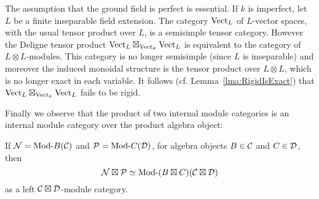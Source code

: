 \documentclass{amsart}
\begin{document}
\begin{example}
	The assumption that the ground field is perfect is essential. If $k$ is imperfect, let $L$ be a finite inseparable field extension. The category $\mathrm{Vect}_L$ of $L$-vector spaces, with the usual tensor product over $L$, is a semisimple tensor category. However the Deligne tensor product $\mathrm{Vect}_L \boxtimes_{\mathrm{Vect}_k} \mathrm{Vect}_L$
	is equivalent to the category of $L \otimes L$-modules. This category is no longer semisimple (since $L$ is inseparable) and moreover the induced monoidal structure is the tensor product over $L \otimes L$, which is no longer exact in each variable. It follows (cf. Lemma~\ref{lma:RigidIsExact}) that $\mathrm{Vect}_L \boxtimes_{\mathrm{Vect}_k} \mathrm{Vect}_L$ fails to be rigid. 
\end{example} 

Finally we observe that the product of two internal module categories is an internal module category over the product algebra object:

\begin{proposition}
	If $\cN = \Mod{}{B}(\cC)$ and $\cP = \Mod{}{C}(\cD)$, for algebra objects $B \in \mathcal C$ and $C \in \mathcal D$, then $$\cN \boxtimes \cP \simeq \Mod{}{(B \boxtimes C)}(\cC \boxtimes \cD)$$ as a left $\mathcal C \boxtimes \mathcal D$-module category.
\end{proposition}
\end{document}
